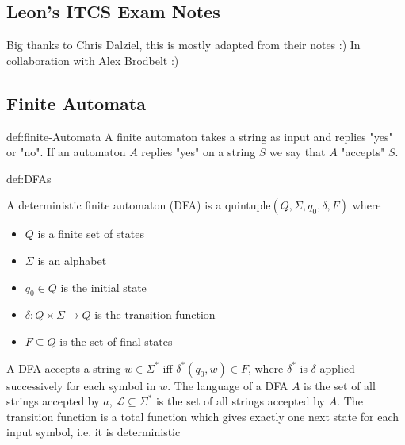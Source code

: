 \documentclass[landscape, 8pt]{extarticle}
\begin{document}
\setlength{\abovedisplayskip}{3.5pt}
\setlength{\belowdisplayskip}{3.5pt}
\setlength{\abovedisplayshortskip}{3.5pt}
\setlength{\belowdisplayshortskip}{3.5pt}

\begin{multicols}{3}
\raggedcolumns %
\section*{\huge Leon's ITCS Exam Notes}
\vspace{-5pt}
Big thanks to Chris Dalziel, this is mostly adapted from their notes :)\newline
In collaboration with Alex Brodbelt :)
\subsection*{Finite Automata}

\begin{dfn}{def:finite-Automata}{}
A finite automaton takes a string as input and replies "yes" or "no". If an automaton $A$ replies "yes" on a string $S$ we say that $A$ "accepts" $S$.
\end{dfn}

\begin{dfn}{def:DFAs}{}

    A deterministic finite automaton (DFA) is a quintuple\newline $(Q,\Sigma, q_{0}, \delta, F)$ where
    \renewcommand\labelitemi{\tiny$\bullet$}
    \begin{itemize}
        \setlength\itemsep{0em}
        \item $Q$ is a finite set of states
        \item $\Sigma$ is an alphabet
        \item $q_{0}\in Q$ is the initial state
        \item $\delta:Q \times \Sigma \to Q$ is the transition function
        \item $F \subseteq Q$ is the set of final states
    \end{itemize}
    A DFA accepts a string $w\in \Sigma^{*}$ iff $\delta^{*}(q_{0}, w)\in F$, where $\delta^{*}$ is $\delta$ applied successively for each symbol in $w$.
    \newline
    The language of a DFA $A$ is the set of all strings accepted by $a$, $\mathcal{L}\subseteq \Sigma^{*}$ is the set of all strings accepted by $A$.
    \newline
    The transition function is a total function which gives exactly one next state for each input symbol, i.e. it is deterministic
\end{dfn}



\end{multicols}
\end{document}

